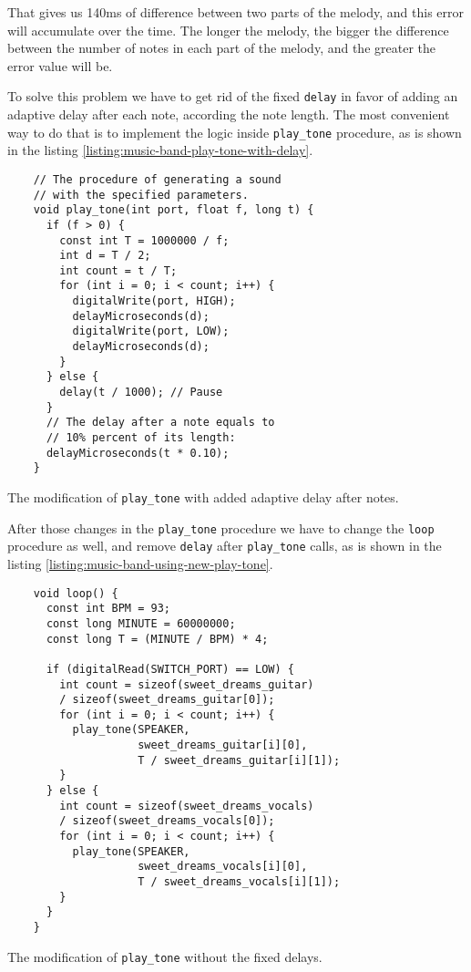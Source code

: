 \documentclass[../sparc.tex]{subfiles}
\begin{document}
That gives us 140ms of difference between two parts of the melody, and this
error will accumulate over the time.  The longer the melody, the bigger the
difference between the number of notes in each part of the melody, and the
greater the error value will be.

To solve this problem we have to get rid of the fixed \texttt{delay} in favor of
adding an adaptive delay after each note, according the note length.  The most
convenient way to do that is to implement the logic inside \texttt{play\_tone}
procedure, as is shown in the listing
\ref{listing:music-band-play-tone-with-delay}.

\begin{listing}[H]
  \begin{verbatim}
    // The procedure of generating a sound
    // with the specified parameters.
    void play_tone(int port, float f, long t) {
      if (f > 0) {
        const int T = 1000000 / f;
        int d = T / 2;
        int count = t / T;
        for (int i = 0; i < count; i++) {
          digitalWrite(port, HIGH);
          delayMicroseconds(d);
          digitalWrite(port, LOW);
          delayMicroseconds(d);
        }
      } else {
        delay(t / 1000); // Pause
      }
      // The delay after a note equals to
      // 10% percent of its length:
      delayMicroseconds(t * 0.10);
    }
  \end{verbatim}
  \caption{The modification of \texttt{play\_tone} with added adaptive delay
    after notes.}
  \label{listing:music-band-play-tone-with-delay}
\end{listing}

\newpage
After those changes in the \texttt{play\_tone} procedure we have to change the
\texttt{loop} procedure as well, and remove \texttt{delay} after
\texttt{play\_tone} calls, as is shown in the listing
\ref{listing:music-band-using-new-play-tone}.

\begin{listing}[H]
  \begin{verbatim}
    void loop() {
      const int BPM = 93;
      const long MINUTE = 60000000;
      const long T = (MINUTE / BPM) * 4;

      if (digitalRead(SWITCH_PORT) == LOW) {
        int count = sizeof(sweet_dreams_guitar)
        / sizeof(sweet_dreams_guitar[0]);
        for (int i = 0; i < count; i++) {
          play_tone(SPEAKER,
                    sweet_dreams_guitar[i][0],
                    T / sweet_dreams_guitar[i][1]);
        }
      } else {
        int count = sizeof(sweet_dreams_vocals)
        / sizeof(sweet_dreams_vocals[0]);
        for (int i = 0; i < count; i++) {
          play_tone(SPEAKER,
                    sweet_dreams_vocals[i][0],
                    T / sweet_dreams_vocals[i][1]);
        }
      }
    }
  \end{verbatim}
  \caption{The modification of \texttt{play\_tone} without the fixed delays.}
  \label{listing:music-band-using-new-play-tone}
\end{listing}
\end{document}
